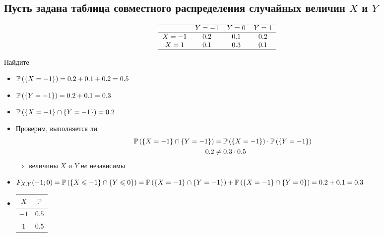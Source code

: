 \documentclass{article}
\begin{document}
\subsection{Пусть задана таблица совместного распределения случайных величин $X$ и $Y$}
\begin{equation*}
    \begin{tabular}{cccc}
        \hline
        &$Y=-1$&$Y=0$&$Y=1$\\
        \hline
        $X=-1$&0.2&0.1&0.2\\
        $X=1$&0.1&0.3&0.1\\
        \hline
    \end{tabular}
\end{equation*}

Найдите
\begin{itemize}
    \item $\mathbb{P}\left(\{X=-1\}\right)=0.2+0.1+0.2=0.5$
    \item $\mathbb{P}\left(\{Y=-1\}\right)=0.2+0.1=0.3$
    \item $\mathbb{P}\left(\{X=-1\}\cap\{Y=-1\}\right)=0.2$ %
    \item Проверим, выполняется ли 
    \begin{equation*}
        \begin{aligned}
            \mathbb{P}\left(\{X=-1\}\cap\{Y=-1\}\right)&=\mathbb{P}\left(\{X=-1\}\right)\cdot\mathbb{P}\left(\{Y=-1\}\right)\\
            0.2&\ne0.3\cdot0.5
        \end{aligned}
    \end{equation*}
    $\Longrightarrow $ величины $X$ и $Y$ \textit{не} независимы
    \item $F_{X,Y}(-1;0)=\mathbb{P}\left(\{X\leqslant-1\}\cap\{Y\leqslant0\}\right)=\mathbb{P}\left(\{X=-1\}\cap\{Y=-1\}\right)+\mathbb{P}\left(\{X=-1\}\cap\{Y=0\}\right)=0.2+0.1=0.3$
    \item \begin{tabular}{c|c}
        $X$&$\mathbb{P}$\\
        \hline
        $-1$&$0.5$\\
        \hline
        $1$&$0.5$
    \end{tabular}


\end{itemize}
\end{document}
